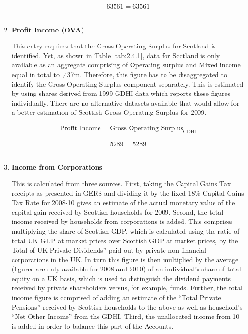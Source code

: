 \begin{enumerate}
\begin{equation} \nonumber
63561 = 63561
\end{equation}\\

\item \textbf {Profit Income (OVA)}

This entry requires that the Gross Operating Surplus for Scotland is identified. Yet, as shown in Table \ref{tab:2.4.1}, data for Scotland is only available as an aggregate comprising of Operating surplus and Mixed income equal in total to ,437m. Therefore, this figure has to be disaggregated to identify the Gross Operating Surplus component separately. This is estimated by using shares derived from 1999 GDHI data which reports these figures individually. There are no alternative datasets available that would allow for a better estimation of Scottish Gross Operating Surplus for 2009. \cite{ONS2011b}

\begin{equation}
\begin{split}
\text{Profit Income} = \text{Gross Operating Surplus}_\text{GDHI}
\end{split} \label{eq:2.5.3}
\end{equation}

\begin{equation} \nonumber
5289 = 5289
\end{equation}\\


\item \textbf {Income from Corporations}

This is calculated from three sources. First, taking the Capital Gains Tax receipts as presented in GERS and dividing it by the fixed 18\% Capital Gains Tax Rate for 2008-10 gives an estimate of the actual monetary value of the capital gain received by Scottish households for 2009. 
Second, the total income received by households from corporations is added. This comprises multiplying the share of Scottish GDP, which is calculated using the ratio of total UK GDP at market prices over Scottish GDP at market prices, by the Total of UK Private Dividends” paid out by private non-financial corporations in the UK. In turn this figure is then multiplied by the average (figures are only available for 2008 and 2010) of an individual’s share of total equity on a UK basis, which is used to distinguish the dividend payments received by private shareholders versus, for example, funds. Further, the total income figure is comprised of adding an estimate of the “Total Private Pensions” received by Scottish households to the above as well as household’s “Net Other Income” from the GDHI. 
Third, the unallocated income from 10 is added in order to balance this part of the Accounts.  \cite{ScotGov2013b,HMRC2013,ONS2011c,ONS2012}



\end{enumerate}
